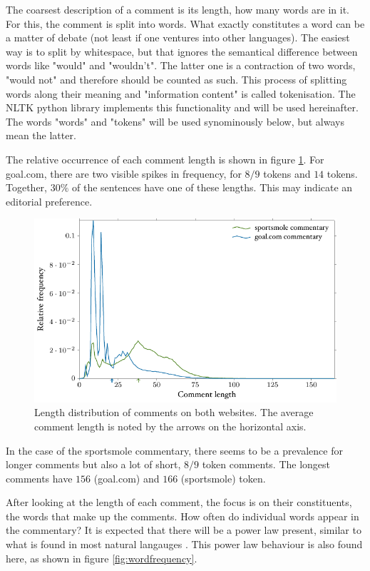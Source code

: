 \documentclass[10pt, a4paper]{UUThesisTemplate}
\begin{document}
The coarsest description of a comment is its length, how many words are in it. For this, the comment is split into words. What exactly constitutes a word can be a matter of debate (not least if one ventures into other languages). The easiest way is to split by white\-space, but that ignores the semantical difference between words like "would" and "wouldn't". The latter one is a contraction of two words, "would not" and therefore should be counted as such. This process of splitting words along their meaning and "information content" is called tokenisation. The NLTK python library \cite{nltk} implements this functionality and will be used hereinafter. The words "words" and "tokens" will be used synominously below, but always mean the latter.

The relative occurrence of each comment length is shown in figure \ref{fig:commentlength}. For goal.com, there are two visible spikes in frequency, for $8/9$ tokens and $14$ tokens. Together, $30\%$ of the sentences have one of these lengths. This may indicate an editorial preference.

\begin{figure}[h!]\centering
\includegraphics{figures/fig_comment_length.pdf}
\caption{Length distribution of comments on both websites. The average comment length is noted by the arrows on the horizontal axis.}\label{fig:commentlength}
\end{figure}

In the case of the sportsmole commentary, there seems to be a prevalence for longer comments but also a lot of short, $8/9$ token comments. The longest comments have $156$ (goal.com) and $166$ (sportsmole) token.

After looking at the length of each comment, the focus is on their constituents, the words that make up the comments. How often do individual words appear in the commentary? It is expected that there will be a power law present, similar to what is found in most natural langauges \cite{wordfreq}. This power law behaviour is also found here, as shown in figure \ref{fig:wordfrequency}.
\end{document}

